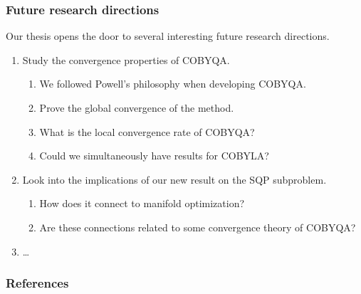 \documentclass{polyu-presentation}
\begin{document}
\begin{frame}
    \frametitle{Future research directions}

    Our thesis opens the door to several interesting future research directions.
    \begin{enumerate}
        \item Study the \alert{convergence} properties of COBYQA.
        \begin{enumerate}
            \item We followed Powell's philosophy when developing COBYQA.
            \item Prove the global convergence of the method.
            \item What is the local convergence rate of COBYQA?
            \item Could we simultaneously have results for COBYLA?
        \end{enumerate}
        \item Look into the \alert{implications} of our new result on the SQP subproblem.
        \begin{enumerate}
            \item How does it connect to \alert{manifold optimization}?
            \item Are these connections related to some convergence theory of COBYQA?
        \end{enumerate}
        \item \dots
    \end{enumerate}
\end{frame}

\appendix

\begin{frame}[t,allowframebreaks]
    \frametitle{References}

	\printbibliography
\end{frame}
\end{document}
